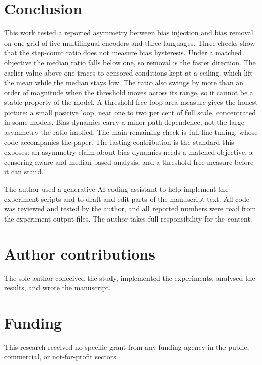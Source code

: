 \documentclass[Afour,sageh,times]{sagej}
\begin{document}
\section{Conclusion}
\label{sec:conclusion}

This work tested a reported asymmetry between bias injection and bias removal on one grid of five multilingual encoders and three languages. Three checks show that the step-count ratio does not measure bias hysteresis. Under a matched objective the median ratio falls below one, so removal is the faster direction. The earlier value above one traces to censored conditions kept at a ceiling, which lift the mean while the median stays low. The ratio also swings by more than an order of magnitude when the threshold moves across its range, so it cannot be a stable property of the model. A threshold-free loop-area measure gives the honest picture: a small positive loop, near one to two per cent of full scale, concentrated in some models. Bias dynamics carry a minor path dependence, not the large asymmetry the ratio implied. The main remaining check is full fine-tuning, whose code accompanies the paper. The lasting contribution is the standard this exposes: an asymmetry claim about bias dynamics needs a matched objective, a censoring-aware and median-based analysis, and a threshold-free measure before it can stand.

\begin{acks}
The author used a generative-AI coding assistant to help implement the experiment scripts and to draft and edit parts of the manuscript text. All code was reviewed and tested by the author, and all reported numbers were read from the experiment output files. The author takes full responsibility for the content.
\end{acks}

\section*{Author contributions}
The sole author conceived the study, implemented the experiments, analysed the results, and wrote the manuscript.

\section*{Funding}
This research received no specific grant from any funding agency in the public, commercial, or not-for-profit sectors.
\end{document}
